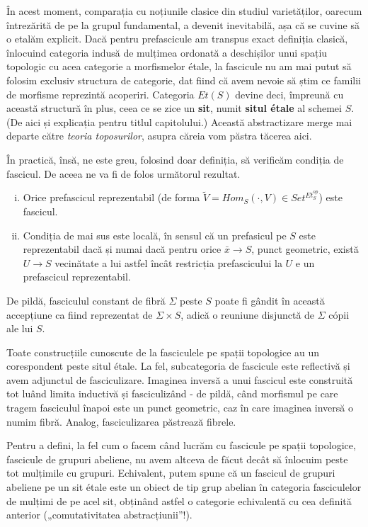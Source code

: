 \documentclass[13pt,openany]{book}
\begin{document}
În acest moment, comparația cu noțiunile clasice din studiul varietăților, oarecum întrezărită de pe la grupul fundamental, a devenit inevitabilă, așa că se cuvine să o etalăm explicit. Dacă pentru prefascicule am transpus exact definiția clasică, înlocuind categoria indusă de mulțimea ordonată a deschișilor unui spațiu topologic cu acea categorie a morfismelor étale, la fascicule nu am mai putut să folosim exclusiv structura de categorie, dat fiind că avem nevoie să știm ce familii de morfisme reprezintă acoperiri. Categoria $Et(S)$ devine deci, împreună cu această structură în plus, ceea ce se zice un {\bf sit}, numit {\bf situl étale} al schemei $S$. (De aici și explicația pentru titlul capitolului.) Această abstractizare merge mai departe către {\it teoria toposurilor}, asupra căreia vom păstra tăcerea aici.

În practică, însă, ne este greu, folosind doar definiția, să verificăm condiția de fascicul. De aceea ne va fi de folos următorul rezultat.

\begin{prop}
\begin{enumerate}[i)]
\item Orice prefascicul reprezentabil (de forma $\widetilde{V} = Hom_S(\cdot,V) \in Set^{Et_S^{op}}$) este fascicul.
\item Condiția de mai sus este locală, în sensul că un prefasicul pe $S$ este reprezentabil dacă și numai dacă pentru orice $\bar{x} \rightarrow S$, punct geometric, există $U \rightarrow S$ vecinătate a lui astfel încât restricția prefascicului la $U$ e un prefascicul reprezentabil.
\end{enumerate}
\end{prop}

De pildă, fasciculul constant de fibră $\Sigma$ peste $S$ poate fi gândit în această accepțiune ca fiind reprezentat de $\Sigma \times S$, adică o reuniune disjunctă de $\Sigma$ cópii ale lui $S$.

Toate construcțiile cunoscute de la fasciculele pe spații topologice au un corespondent peste situl étale. La fel, subcategoria de fascicule este reflectivă și avem adjunctul de fasciculizare. Imaginea inversă a unui fascicul este construită tot luând limita inductivă și fasciculizând - de pildă, când morfismul pe care tragem fasciculul înapoi este un punct geometric, caz în care imaginea inversă o numim fibră. Analog, fasciculizarea păstrează fibrele.

Pentru a defini, la fel cum o facem când lucrăm cu fascicule pe spații topologice, fascicule de grupuri abeliene, nu avem altceva de făcut decât să înlocuim peste tot mulțimile cu grupuri. Echivalent, putem spune că un fascicul de grupuri abeliene pe un sit étale este un obiect de tip grup abelian în categoria fasciculelor de mulțimi de pe acel sit, obținând astfel o categorie echivalentă cu cea definită anterior („comutativitatea abstracțiunii”!).
\end{document}
